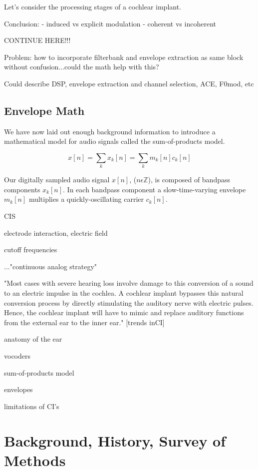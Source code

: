 \documentclass [11pt, proquest] {uwthesis}[2015/03/03]
\begin{document}
Let's consider the processing stages of a cochlear implant.

Conclusion:
- induced vs explicit modulation
- coherent vs incoherent

CONTINUE HERE!!!

Problem: how to incorporate filterbank and envelope extraction as same block without confusion...could the math help with this?

Could describe DSP, envelope extraction and channel selection, ACE, F0mod, etc

\subsection{Envelope Math}

We have now laid out enough background information to introduce a mathematical model for audio signals called the sum-of-products model.

\begin{equation}
\label{eq:sum-of-products}
x[n] = \sum\limits_k x_k[n] = \sum\limits_k m_k[n] c_k[n]
\end{equation}

Our digitally sampled audio signal $x[n]$, ($n \epsilon \mathbb{Z}$), is composed of bandpass components $x_k[n]$.  In each bandpass component a slow-time-varying envelope $m_k[n]$ multiplies a quickly-oscillating carrier $c_k[n]$.


CIS

electrode interaction, electric field

cutoff frequencies

..."continuous analog strategy"

"Most cases with severe hearing loss involve damage to this conversion of a sound to an electric impulse in the cochlea. A cochlear implant bypasses this natural conversion process by directly stimulating the auditory nerve with electric pulses. Hence, the cochlear implant will have to mimic and replace auditory functions from the external ear to the inner ear." [trends inCI]

anatomy of the ear

vocoders

sum-of-products model

envelopes

limitations of CI's

\section{Background, History, Survey of Methods}
\end{document}
